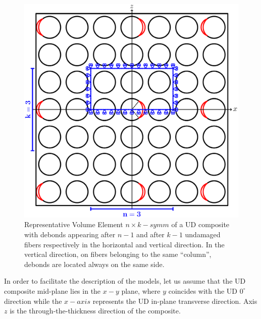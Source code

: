 \documentclass[smallextended]{svjour3}       %
\begin{document}
\begin{figure}[!h]
\centering
\includegraphics[width=\textwidth]{coupling.pdf}
\caption{Representative Volume Element $n\times k-symm$ of a UD composite with debonds appearing after $n-1$ and after $k-1$ undamaged fibers respectively in the horizontal and vertical direction. In the vertical direction, on fibers belonging to the same ``column'', debonds are located always on the same side.}\label{fig:laminateModelsA}
\end{figure}

In order to facilitate the description of the models, let us assume that the UD composite mid-plane lies in the $x-y$ plane, where $y$ coincides with the UD $0^{\circ}$ direction while the $x-axis$ represents the UD in-plane transverse direction. Axis $z$ is the through-the-thickness direction of the composite.
\end{document}
